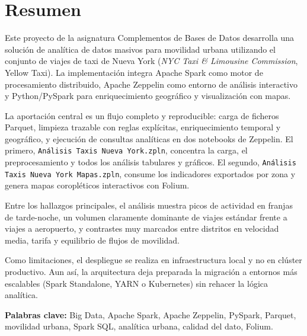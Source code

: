 \chapter*{Resumen}
Este proyecto de la asignatura Complementos de Bases de Datos desarrolla una solución
de analítica de datos masivos para movilidad urbana utilizando el conjunto de viajes de
taxi de Nueva York (\textit{NYC Taxi \& Limousine Commission}, Yellow Taxi).
La implementación integra Apache Spark como motor de procesamiento distribuido,
Apache Zeppelin como entorno de análisis interactivo y Python/PySpark para
enriquecimiento geográfico y visualización con mapas.

La aportación central es un flujo completo y reproducible: carga de ficheros Parquet,
limpieza trazable con reglas explícitas, enriquecimiento temporal y geográfico, y
ejecución de consultas analíticas en dos notebooks de Zeppelin. El primero,
\texttt{Análisis Taxis Nueva York.zpln}, concentra la carga, el preprocesamiento y
todos los análisis tabulares y gráficos. El segundo,
\texttt{Análisis Taxis Nueva York Mapas.zpln}, consume los indicadores exportados
por zona y genera mapas coropléticos interactivos con Folium.

Entre los hallazgos principales, el análisis muestra picos de actividad en franjas de
tarde-noche, un volumen claramente dominante de viajes estándar frente a viajes a
aeropuerto, y contrastes muy marcados entre distritos en velocidad media, tarifa y
equilibrio de flujos de movilidad.

Como limitaciones, el despliegue se realiza en infraestructura local y no en clúster
productivo. Aun así, la arquitectura deja preparada la migración a entornos más
escalables (Spark Standalone, YARN o Kubernetes) sin rehacer la lógica analítica.

\vspace{.5cm}

\textbf{Palabras clave:} Big Data, Apache Spark, Apache Zeppelin, PySpark, Parquet,
movilidad urbana, Spark SQL, analítica urbana, calidad del dato, Folium.